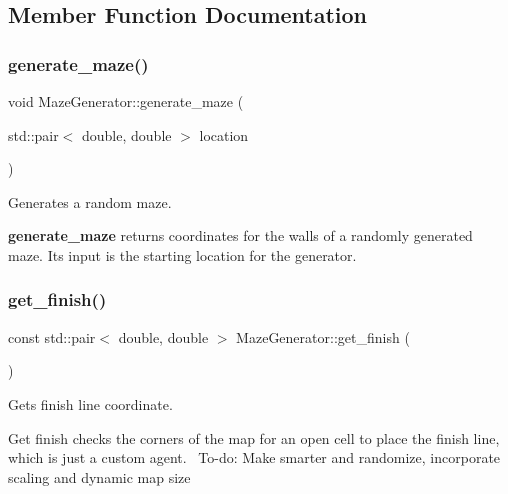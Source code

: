 \subsection{Member Function Documentation}
\mbox{\label{classMazeGenerator_a67dbf663cdcc539fdb7583e8adcd58dc}} 
\subsubsection{\texorpdfstring{generate\+\_\+maze()}{generate\_maze()}}
{\footnotesize\ttfamily void Maze\+Generator\+::generate\+\_\+maze (\begin{DoxyParamCaption}\item[{std\+::pair$<$ double, double $>$}]{location }\end{DoxyParamCaption})}



Generates a random maze. 

{\bfseries generate\+\_\+maze} returns coordinates for the walls of a randomly generated maze. Its input is the starting location for the generator. \mbox{\label{classMazeGenerator_a98a262b1588845a44c47ff59f9f3dccd}} 
\subsubsection{\texorpdfstring{get\+\_\+finish()}{get\_finish()}}
{\footnotesize\ttfamily const std\+::pair$<$ double, double $>$ Maze\+Generator\+::get\+\_\+finish (\begin{DoxyParamCaption}{ }\end{DoxyParamCaption})}



Gets finish line coordinate. 

Get finish checks the corners of the map for an open cell to place the finish line, which is just a custom agent.~\newline
 To-\/do\+: Make smarter and randomize, incorporate scaling and dynamic map size \mbox{\label{classMazeGenerator_ad3273f40be7ddb219fb419a8c0d707c3}} 
